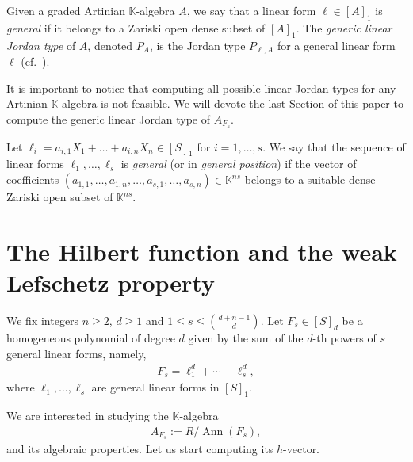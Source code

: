 \documentclass[12pt,twoside]{amsart}
\numberwithin{equation}{section} \hyphenation{semi-stable}
\newcommand{\K}{\mathbb{K}}
\theoremstyle{definition}
\begin{document}
Given a graded Artinian $\K$-algebra $A$, we say that a linear form $\ell\in [A]_1$ is \textit{general} if it belongs to a Zariski open dense subset of $[A]_1$.
The \textit{generic linear Jordan type} of $A$, denoted $P_{A}$, is the Jordan type $P_{\ell,A}$ for a general linear form $\ell $ (cf.\ \cite[Lemma 2.54, Definition 2.55]{IMM22}).

It is important to notice that computing all possible linear Jordan types for any Artinian $\K$-algebra is not feasible. We will devote the last Section of this paper to compute the generic linear Jordan type of $A_{F_s}$.


Let $\ell_i = a_{i,1}X_1 + \dots + a_{i,n}X_n \in [S]_1$ for $i = 1, \dots, s$. We say that the sequence of linear forms $\ell_1, \dots, \ell_s$ is \emph{general} (or in \emph{general position}) if the vector of coefficients $(a_{1,1}, \dots, a_{1,n}, \dots, a_{s,1}, \dots, a_{s,n}) \in \mathbb{K}^{ns}$ belongs to a suitable dense Zariski open subset of $\mathbb{K}^{ns}$. 




\section{The Hilbert function and the weak Lefschetz property}\label{section3}


We fix  integers $n\ge 2$, $d \ge 1$ and 
$1 \le s \le \binom{d+n-1}{d}$. Let $F_{s} \in [S]_d$ be a homogeneous polynomial of degree $d$ given by the sum of the $d$-th powers of $s$ general linear forms, namely,
\begin{eqnarray*}
F_{s} = \ell_1^d + \cdots + \ell_s^d,
\end{eqnarray*}
where $\ell_1, \dots, \ell_s$ are general linear forms in $[S]_1$.

We are interested in studying the $\K$-algebra
\begin{eqnarray*}
A_{F_{s}} := R / \operatorname{Ann}(F_{s}),
\end{eqnarray*}
and its algebraic properties. Let us start computing its $h$-vector.
\end{document}
